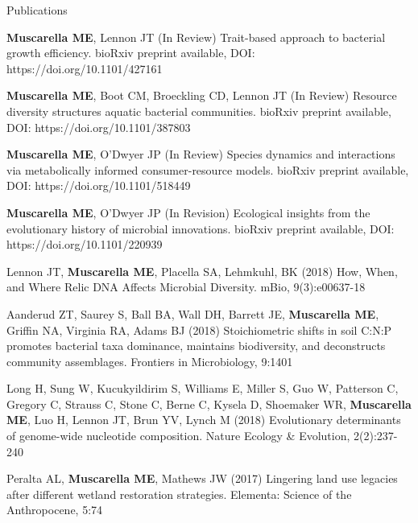 \documentclass{resume} %
\begin{document}
\begin{rSection}{Publications}

{\bf Muscarella ME}, Lennon JT (In Review) Trait-based approach to bacterial growth efficiency. 
bioRxiv preprint available, DOI: https://doi.org/10.1101/427161

{\bf Muscarella ME}, Boot CM, Broeckling CD, Lennon JT (In Review) Resource diversity structures aquatic bacterial communities. 
bioRxiv preprint available, DOI: https://doi.org/10.1101/387803

{\bf Muscarella ME}, O'Dwyer JP (In Review) Species dynamics and interactions via metabolically informed consumer-resource models. 
bioRxiv preprint available, DOI: https://doi.org/10.1101/518449 

{\bf Muscarella ME}, O'Dwyer JP (In Revision) Ecological insights from the evolutionary history of microbial innovations. 
bioRxiv preprint available, DOI: https://doi.org/10.1101/220939

Lennon JT, {\bf Muscarella ME}, Placella SA, Lehmkuhl, BK (2018)
How, When, and Where Relic DNA Affects Microbial Diversity.
mBio, 9(3):e00637-18

Aanderud ZT, Saurey S, Ball BA, Wall DH, Barrett JE, {\bf Muscarella ME},
Griffin NA, Virginia RA, Adams BJ (2018) Stoichiometric shifts in soil C:N:P
promotes bacterial taxa dominance, maintains biodiversity, and deconstructs
community assemblages. Frontiers in Microbiology, 9:1401

Long H, Sung W, Kucukyildirim S, Williams E, Miller S, Guo W, Patterson C,
Gregory C, Strauss C, Stone C, Berne C, Kysela D, Shoemaker WR, {\bf Muscarella
ME}, Luo H, Lennon JT, Brun YV, Lynch M (2018) Evolutionary determinants of
genome-wide nucleotide composition. Nature Ecology \& Evolution, 2(2):237-240

Peralta AL, {\bf Muscarella ME}, Mathews JW (2017) Lingering land use
legacies after different wetland restoration strategies.
Elementa: Science of the Anthropocene, 5:74


\end{rSection}
\end{document}

